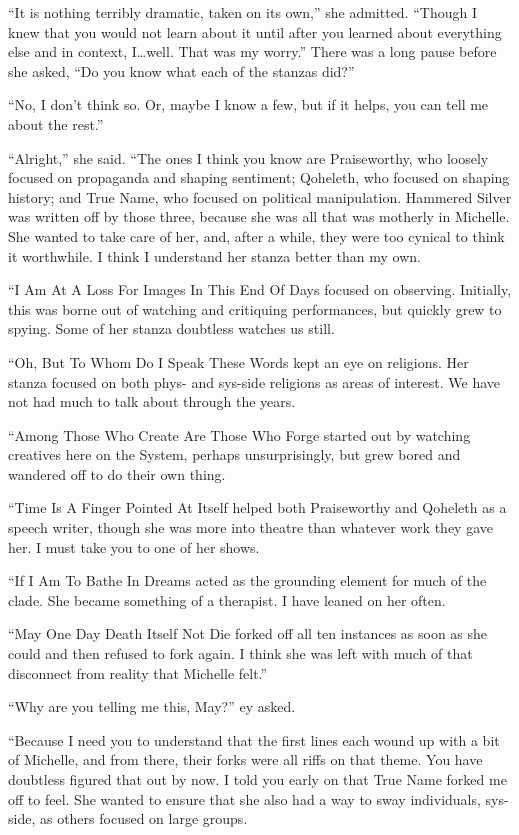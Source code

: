 ``It is nothing terribly dramatic, taken on its own,'' she admitted. ``Though I knew that you would not learn about it until after you learned about everything else and in context, I\ldots well. That was my worry.'' There was a long pause before she asked, ``Do you know what each of the stanzas did?''

``No, I don't think so. Or, maybe I know a few, but if it helps, you can tell me about the rest.''

``Alright,'' she said. ``The ones I think you know are Praiseworthy, who loosely focused on propaganda and shaping sentiment; Qoheleth, who focused on shaping history; and True Name, who focused on political manipulation. Hammered Silver was written off by those three, because she was all that was motherly in Michelle. She wanted to take care of her, and, after a while, they were too cynical to think it worthwhile. I think I understand her stanza better than my own.

``I Am At A Loss For Images In This End Of Days focused on observing. Initially, this was borne out of watching and critiquing performances, but quickly grew to spying. Some of her stanza doubtless watches us still.

``Oh, But To Whom Do I Speak These Words kept an eye on religions. Her stanza focused on both phys- and sys-side religions as areas of interest. We have not had much to talk about through the years.

``Among Those Who Create Are Those Who Forge started out by watching creatives here on the System, perhaps unsurprisingly, but grew bored and wandered off to do their own thing.

``Time Is A Finger Pointed At Itself helped both Praiseworthy and Qoheleth as a speech writer, though she was more into theatre than whatever work they gave her. I must take you to one of her shows.

``If I Am To Bathe In Dreams acted as the grounding element for much of the clade. She became something of a therapist. I have leaned on her often.

``May One Day Death Itself Not Die forked off all ten instances as soon as she could and then refused to fork again. I think she was left with much of that disconnect from reality that Michelle felt.''

``Why are you telling me this, May?'' ey asked.

``Because I need you to understand that the first lines each wound up with a bit of Michelle, and from there, their forks were all riffs on that theme. You have doubtless figured that out by now. I told you early on that True Name forked me off to feel. She wanted to ensure that she also had a way to sway individuals, sys-side, as others focused on large groups.

